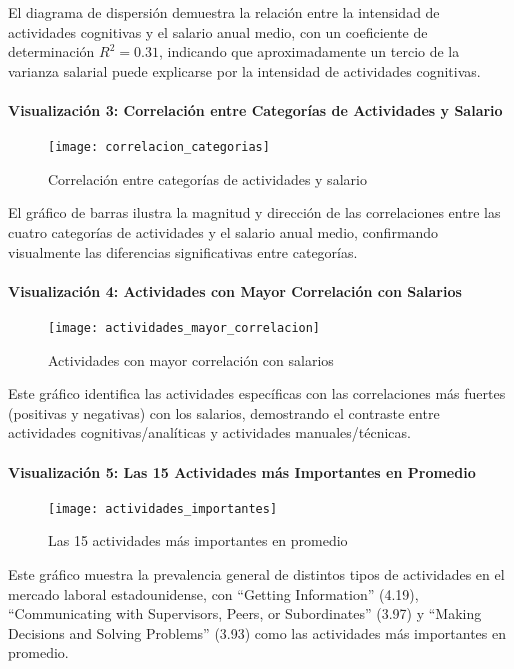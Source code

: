 \documentclass{article}
\theoremstyle{remark}
\theoremstyle{definition}
\begin{document}
\begin{tcolorbox}
El diagrama de dispersión demuestra la relación entre la intensidad de actividades cognitivas y el salario anual medio, con un coeficiente de determinación $R^2 = 0.31$, indicando que aproximadamente un tercio de la varianza salarial puede explicarse por la intensidad de actividades cognitivas.

\paragraph{Visualización 3: Correlación entre Categorías de Actividades y Salario}
\begin{figure}[H]
    \centering
    \texttt{[image: correlacion\_categorias]}
    \caption{Correlación entre categorías de actividades y salario}
    \label{fig:corr_categorias}
\end{figure}

El gráfico de barras ilustra la magnitud y dirección de las correlaciones entre las cuatro categorías de actividades y el salario anual medio, confirmando visualmente las diferencias significativas entre categorías.

\paragraph{Visualización 4: Actividades con Mayor Correlación con Salarios}
\begin{figure}[H]
    \centering
    \texttt{[image: actividades\_mayor\_correlacion]}
    \caption{Actividades con mayor correlación con salarios}
    \label{fig:actividades_correlacion}
\end{figure}

Este gráfico identifica las actividades específicas con las correlaciones más fuertes (positivas y negativas) con los salarios, demostrando el contraste entre actividades cognitivas/analíticas y actividades manuales/técnicas.

\paragraph{Visualización 5: Las 15 Actividades más Importantes en Promedio}
\begin{figure}[H]
    \centering
    \texttt{[image: actividades\_importantes]}
    \caption{Las 15 actividades más importantes en promedio}
    \label{fig:actividades_importantes}
\end{figure}

Este gráfico muestra la prevalencia general de distintos tipos de actividades en el mercado laboral estadounidense, con ``Getting Information'' (4.19), ``Communicating with Supervisors, Peers, or Subordinates'' (3.97) y ``Making Decisions and Solving Problems'' (3.93) como las actividades más importantes en promedio.


\end{tcolorbox}
\end{document}
